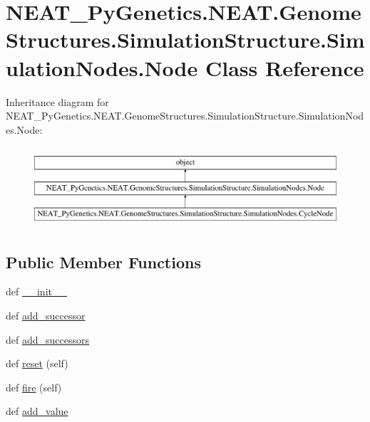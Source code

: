 \hypertarget{classNEAT__PyGenetics_1_1NEAT_1_1GenomeStructures_1_1SimulationStructure_1_1SimulationNodes_1_1Node}{}\section{N\+E\+A\+T\+\_\+\+Py\+Genetics.\+N\+E\+A\+T.\+Genome\+Structures.\+Simulation\+Structure.\+Simulation\+Nodes.\+Node Class Reference}
\label{classNEAT__PyGenetics_1_1NEAT_1_1GenomeStructures_1_1SimulationStructure_1_1SimulationNodes_1_1Node}
Inheritance diagram for N\+E\+A\+T\+\_\+\+Py\+Genetics.\+N\+E\+A\+T.\+Genome\+Structures.\+Simulation\+Structure.\+Simulation\+Nodes.\+Node\+:\begin{figure}[H]
\begin{center}
\leavevmode
\includegraphics[height=3.000000cm]{classNEAT__PyGenetics_1_1NEAT_1_1GenomeStructures_1_1SimulationStructure_1_1SimulationNodes_1_1Node}
\end{center}
\end{figure}
\subsection*{Public Member Functions}
\begin{DoxyCompactItemize}
\item 
def \hyperlink{classNEAT__PyGenetics_1_1NEAT_1_1GenomeStructures_1_1SimulationStructure_1_1SimulationNodes_1_1Node_adc4a4683c2a06deaf2804d6f2745df3c}{\+\_\+\+\_\+init\+\_\+\+\_\+}
\item 
def \hyperlink{classNEAT__PyGenetics_1_1NEAT_1_1GenomeStructures_1_1SimulationStructure_1_1SimulationNodes_1_1Node_a97ac70897d562bce07c8395c17fe2a1b}{add\+\_\+successor}
\item 
def \hyperlink{classNEAT__PyGenetics_1_1NEAT_1_1GenomeStructures_1_1SimulationStructure_1_1SimulationNodes_1_1Node_a101dbc625ef502856902d623193e2901}{add\+\_\+successors}
\item 
def \hyperlink{classNEAT__PyGenetics_1_1NEAT_1_1GenomeStructures_1_1SimulationStructure_1_1SimulationNodes_1_1Node_ae2ad3e79c3b1a95bffd61b932f54f566}{reset} (self)
\item 
def \hyperlink{classNEAT__PyGenetics_1_1NEAT_1_1GenomeStructures_1_1SimulationStructure_1_1SimulationNodes_1_1Node_abc0a976efab6982a2630d01489554fde}{fire} (self)
\item 
def \hyperlink{classNEAT__PyGenetics_1_1NEAT_1_1GenomeStructures_1_1SimulationStructure_1_1SimulationNodes_1_1Node_aecc180ca33b3e3acd7601a3ad3e63b7d}{add\+\_\+value}
\end{DoxyCompactItemize}
